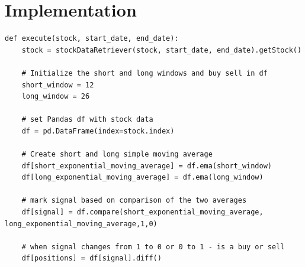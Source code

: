 \documentclass[letterpaper,11pt]{article}
\begin{document}
\section*{Implementation}
\begin{verbatim}
def execute(stock, start_date, end_date):
    stock = stockDataRetriever(stock, start_date, end_date).getStock()

    # Initialize the short and long windows and buy sell in df
    short_window = 12
    long_window = 26

    # set Pandas df with stock data
    df = pd.DataFrame(index=stock.index)

    # Create short and long simple moving average
    df[short_exponential_moving_average] = df.ema(short_window)
    df[long_exponential_moving_average] = df.ema(long_window)

    # mark signal based on comparison of the two averages
    df[signal] = df.compare(short_exponential_moving_average, long_exponential_moving_average,1,0)

    # when signal changes from 1 to 0 or 0 to 1 - is a buy or sell
    df[positions] = df[signal].diff()

\end{verbatim}



\end{document}
